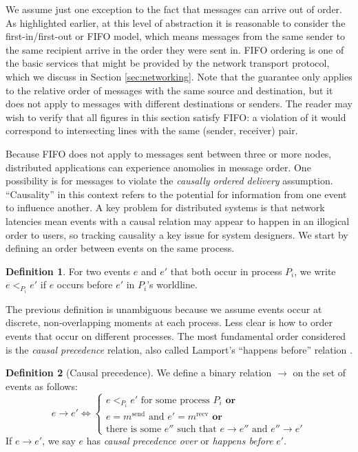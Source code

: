 \documentclass[]             %
{NASA}                       %
\theoremstyle{definition}
\newtheorem{definition}{Definition}[section]
\begin{document}
We assume just one exception to the fact that messages can arrive out
of order. As highlighted earlier, at this level of abstraction it is
reasonable to consider the first-in/first-out or FIFO model, which
means messages from the same sender to the same recipient arrive in
the order they were sent in. FIFO ordering is one of the basic
services that might be provided by the network transport protocol,
which we discuss in Section \ref{sec:networking}. Note that the
guarantee only applies to the relative order of messages with the same
source and destination, but it does not apply to messages with
different destinations or senders. The reader may wish to verify that
all figures in this section satisfy FIFO: a violation of it would
correspond to intersecting lines with the same (sender, receiver)
pair.

Because FIFO does not apply to messages sent between three or more
nodes, distributed applications can experience anomolies in message
order. One possibility is for messages to violate the \emph{causally
  ordered delivery} assumption. ``Causality'' in this context refers
to the potential for information from one event to influence
another. A key problem for distributed systems is that network
latencies mean events with a causal relation may appear to happen in
an illogical order to users, so tracking causality a key issue for
system designers. We start by defining an order between events on the
same process.

\begin{definition}
  For two events $e$ and $e'$ that both occur in process $P_i$, we
  write $e <_{P_i} e'$ if $e$ occurs before $e'$ in $P_i$'s
  worldline.
\end{definition}

The previous definition is unambiguous because we assume events occur
at discrete, non-overlapping moments at each process. Less clear is
how to order events that occur on different processes. The most
fundamental order considered is the \emph{causal precedence} relation,
also called Lamport's ``happens before'' relation \cite{1978:lamportclocks}.

\begin{definition}[Causal precedence]
  \label{def:causalprecedence}
  We define a binary relation $\to$ on the set of events as follows:
  \[e \to e' \iff
  \begin{cases}
    e <_{P_i} e' \textrm{ for some process $P_i$}
    \textbf{ or} \\
    e = m^\textrm{send} \textrm{ and } e' = m^\textrm{recv}
    \textbf{ or} \\
    \textrm{there is some } e'' \textrm{ such that } e \to e'' \textrm{ and } e'' \to e'
  \end{cases}
  \]
  If $e \to e'$, we say $e$ has \emph{causal precedence over} or
  \emph{happens before} $e'$.
\end{definition}%
\end{document}
